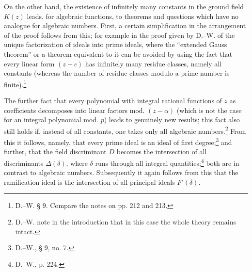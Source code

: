 \documentclass[11pt]{article}
\begin{document}
On the other hand, the existence of infinitely many constants in the ground field \(K(z)\) leads, for algebraic functions, to theorems and questions which have no analogue for algebraic numbers. First, a certain simplification in the arrangement of the proof follows from this; for example in the proof given by D.--W. of the unique factorization of ideals into prime ideals, where the ``extended Gauss theorem'' or a theorem equivalent to it can be avoided by using the fact that every linear form \((z-c)\) has infinitely many residue classes, namely all constants (whereas the number of residue classes modulo a prime number is finite).\footnote{D.--W. § 9. Compare the notes on pp. 212 and 213.}

The further fact that every polynomial with integral rational functions of \(z\) as coefficients decomposes into linear factors mod. \((z-\alpha)\) (which is not the case for an integral polynomial mod. \(p\)) leads to genuinely new results; this fact also still holds if, instead of all constants, one takes only all algebraic numbers.\footnote{D.--W. note in the introduction that in this case the whole theory remains intact.} From this it follows, namely, that every prime ideal is an ideal of first degree;\footnote{D.--W., § 9, no. 7.} and further, that the field discriminant \(D\) becomes the intersection of all discriminants \(\Delta(\delta)\), where \(\delta\) runs through all integral quantities;\footnote{D.--W., p. 224.} both are in contrast to algebraic numbers. Subsequently it again follows from this that the ramification ideal is the intersection of all principal ideals \(F'(\delta)\).
\end{document}
